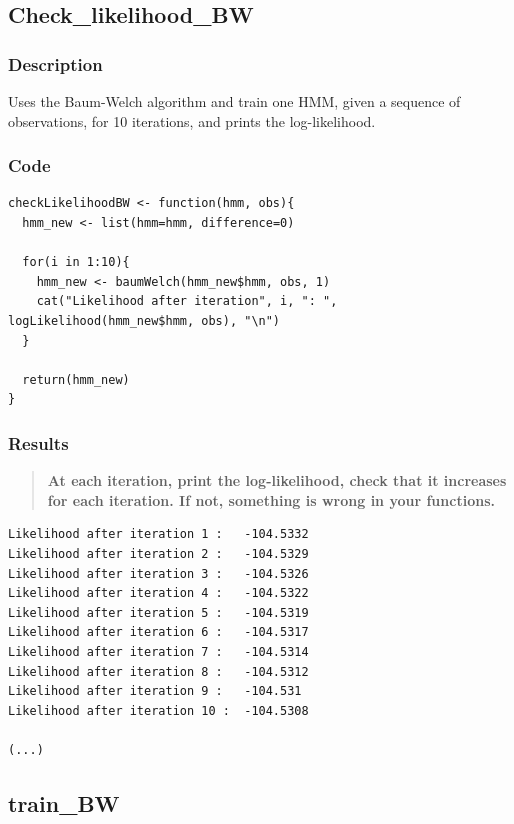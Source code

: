 \documentclass[a4paper]{article}
\begin{document}
\subsection{Check\_likelihood\_BW}

\subsubsection{Description}

Uses the Baum-Welch algorithm and train one HMM, given a sequence of observations, for 10 iterations, and prints the log-likelihood.

\subsubsection{Code}

\begin{lstlisting}
checkLikelihoodBW <- function(hmm, obs){
  hmm_new <- list(hmm=hmm, difference=0)
  
  for(i in 1:10){
    hmm_new <- baumWelch(hmm_new$hmm, obs, 1)
    cat("Likelihood after iteration", i, ": ", logLikelihood(hmm_new$hmm, obs), "\n")
  }
  
  return(hmm_new)
}
\end{lstlisting}

\subsubsection{Results}

\begin{quotation}
\textbf{At each iteration, print the log-likelihood, check that it increases for each iteration. If not, something is wrong in your functions.}
\end{quotation}

\begin{lstlisting}
Likelihood after iteration 1 :   -104.5332 
Likelihood after iteration 2 :   -104.5329 
Likelihood after iteration 3 :   -104.5326 
Likelihood after iteration 4 :   -104.5322 
Likelihood after iteration 5 :   -104.5319 
Likelihood after iteration 6 :   -104.5317 
Likelihood after iteration 7 :   -104.5314 
Likelihood after iteration 8 :   -104.5312 
Likelihood after iteration 9 :   -104.531 
Likelihood after iteration 10 :  -104.5308 

(...)
\end{lstlisting}

\subsection{train\_BW}
\end{document}
